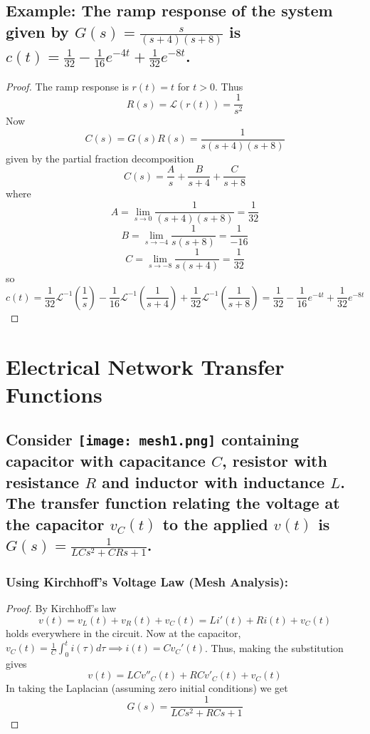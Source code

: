 \documentclass[11pt]{article}
\begin{document}
\subsection{Example: The ramp response of the system given by $G(s) = \frac{s}{(s + 4)(s + 8)}$ is $c(t) = \frac{1}{32} - \frac{1}{16}e^{-4t} + \frac{1}{32} e^{-8t}$.}

\begin{proof}
	The ramp response is $r(t) = t$ for $t > 0$. Thus
	\[R(s) = \mathcal{L}(r(t)) = \frac{1}{s^2}\] Now
	\[C(s) = G(s)R(s) = \frac{1}{s(s + 4)(s + 8)}\] given by the partial fraction decomposition
	\[C(s) = \frac{A}{s} + \frac{B}{s + 4} + \frac{C}{s + 8}\] where
	\[A = \lim_{s \to 0} \frac{1}{(s + 4)(s + 8)} = \frac{1}{32}\]
	\[B = \lim_{s \to -4} \frac{1}{s(s + 8)} = \frac{1}{-16}\]
	\[C = \lim_{s \to -8} \frac{1}{s(s + 4)} = \frac{1}{32}\] so 
	\[c(t) = \frac{1}{32} \mathcal{L}^{-1}(\frac{1}{s}) - \frac{1}{16} \mathcal{L}^{-1}(\frac{1}{s + 4}) + \frac{1}{32} \mathcal{L}^{-1}(\frac{1}{s + 8}) = \frac{1}{32} - \frac{1}{16}e^{-4t} + \frac{1}{32}e^{-8t}\]
\end{proof}

\section{Electrical Network Transfer Functions}

\subsection{Consider \newline
\texttt{[image: mesh1.png]} containing capacitor with capacitance $C$, resistor with resistance $R$ and inductor with inductance $L$. The transfer function relating the voltage at the capacitor $v_C(t)$ to the applied $v(t)$ is $G(s) = \frac{1}{LCs^2 + CRs + 1}$.}


\subsubsection{Using Kirchhoff's Voltage Law (Mesh Analysis): }
\begin{proof}
	By Kirchhoff's law
	\[v(t) = v_L(t) + v_R(t) + v_C(t) = L i'(t) + Ri(t) + v_C(t)\]
	holds everywhere in the circuit. Now at the capacitor, $v_C(t) = \frac{1}{C} \int_0^t i(\tau) d\tau \implies i(t) = Cv_C'(t)$. Thus, making the substitution gives
	\[ v(t) = LCv''_C(t) + RCv'_C(t) + v_C(t)\]
	In taking the Laplacian (assuming zero initial conditions) we get
	\[G(s) = \frac{1}{LCs^2 + RCs + 1}\]
\end{proof}
\end{document}
